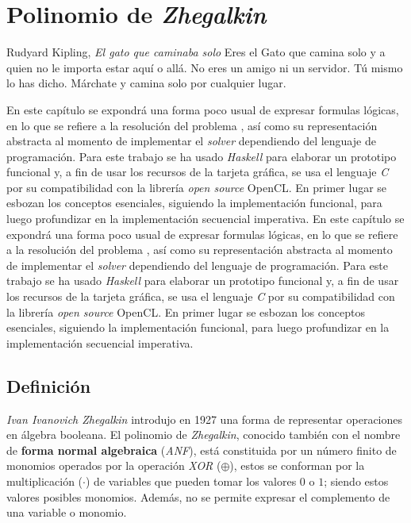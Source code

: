 \chapter{Polinomio de \textit{Zhegalkin}}

\begin{chapquote}{Rudyard Kipling, \textit{El gato que caminaba solo}}
Eres el Gato que camina solo y a quien no le importa estar aquí o allá. No eres un amigo ni un servidor. Tú mismo lo has dicho. Márchate y camina solo por cualquier lugar.
\end{chapquote}

En este capítulo se expondrá una forma poco usual de expresar formulas lógicas, en lo que se refiere a la resolución del problema \sat, así como su representación abstracta al momento de implementar el \textit{solver} dependiendo del lenguaje de programación. Para este trabajo se ha usado \textit{Haskell} para elaborar un prototipo funcional y, a fin de usar los recursos de la tarjeta gráfica, se usa el lenguaje \textit{C} por su compatibilidad con la librería \textit{open source} OpenCL. En primer lugar se esbozan los conceptos esenciales, siguiendo la implementación funcional, para luego profundizar en la implementación secuencial imperativa.
En este capítulo se expondrá una forma poco usual de expresar formulas lógicas, en lo que se refiere a la resolución del problema \sat, así como su representación abstracta al momento de implementar el \textit{solver} dependiendo del lenguaje de programación. Para este trabajo se ha usado \textit{Haskell} para elaborar un prototipo funcional y, a fin de usar los recursos de la tarjeta gráfica, se usa el lenguaje \textit{C} por su compatibilidad con la librería \textit{open source} OpenCL. En primer lugar se esbozan los conceptos esenciales, siguiendo la implementación funcional, para luego profundizar en la implementación secuencial imperativa.

\section{Definición}

\emph{Ivan Ivanovich Zhegalkin} introdujo en 1927 una forma de representar operaciones en álgebra booleana. El polinomio de \textit{Zhegalkin}, conocido también con el nombre de \textbf{forma normal algebraica} (\textit{ANF}), está constituida por un número finito de monomios operados por la operación \textit{XOR} ($\oplus$), estos se conforman por la multiplicación ($\cdot$) de variables que pueden tomar los valores $0$ o $1$; siendo estos valores posibles monomios. Además, no se permite expresar el complemento de una variable o monomio.

